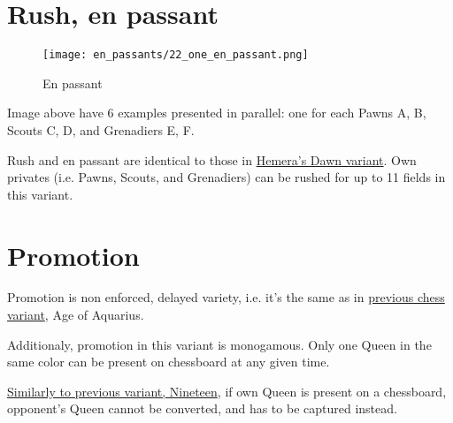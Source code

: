 \clearpage %

\section*{Rush, en passant}
\label{sec:One/Rush, en passant}

\vspace*{-1.4\baselineskip}
\noindent
\begin{figure}[!h]
\texttt{[image: en\_passants/22\_one\_en\_passant.png]}
\vspace*{-1.3\baselineskip}
\caption{En passant}
\label{fig:22_one_en_passant}
\end{figure}

\vspace*{-0.5\baselineskip}
Image above have 6 examples presented in parallel: one for each Pawns A, B,
Scouts C, D, and Grenadiers E, F.

Rush and en passant are identical to those in
\hyperref[fig:14_hemera_s_dawn_en_passant]{Hemera's Dawn variant}.
Own privates (i.e. Pawns, Scouts, and Grenadiers) can be rushed for up to 11
fields in this variant.

\clearpage %

\section*{Promotion}
\label{sec:One/Promotion}

Promotion is non enforced, delayed variety, i.e. it's the same as in
\hyperref[sec:Age of Aquarius/Promotion]{previous chess variant}, Age of Aquarius.

Additionaly, promotion in this variant is monogamous. Only one Queen
in the same color can be present on chessboard at any given time.

\hyperref[fig:scn_n_22_only_one_queen]{Similarly to previous variant, Nineteen},
if own Queen is present on a chessboard, opponent's Queen cannot be
converted, and has to be captured instead.

\clearpage %

